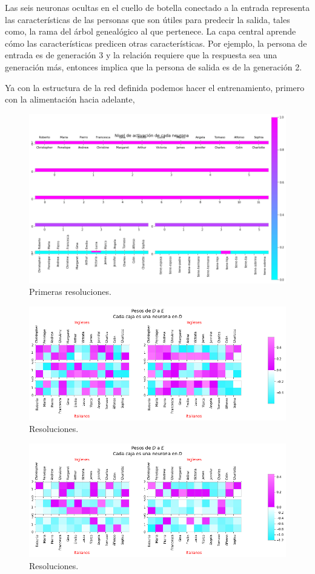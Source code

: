 Las seis neuronas ocultas en el cuello de botella conectado a la entrada representa las características de las personas que son útiles para predecir la salida, tales como, la rama del árbol genealógico al que pertenece.
La capa central aprende cómo las características predicen otras características. Por ejemplo, la persona de entrada es de generación 3 y la relación requiere que la respuesta sea una generación más, entonces implica que la persona de salida es de la generación 2.

Ya con la estructura de la red definida podemos hacer el entrenamiento, primero con la alimentación hacia adelante, 

  \begin{figure}[h]
   \centering
   \includegraphics[scale=.5]{../Figuras/Hinton/r1.png}
   \caption{Primeras resoluciones.}
  \label{fig:r1}
  \end{figure}

    \begin{figure}[h]
   \centering
   \includegraphics[scale=.5]{../Figuras/Hinton/r2.png}
   \caption{Resoluciones.}
  \label{fig:r2}
  \end{figure}

    \begin{figure}[h]
   \centering
   \includegraphics[scale=.5]{../Figuras/Hinton/r3.png}
   \caption{Resoluciones.}
  \label{fig:r3}
  \end{figure}

  
 
 
